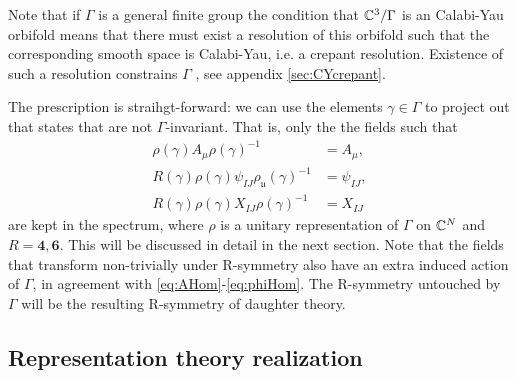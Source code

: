 \documentclass[a4paper,10pt]{article}
\begin{document}
        Note that if $\Gamma$ is a general finite group the condition that $\mathbb{C}^3/\Gamma$ is an Calabi-Yau orbifold means that there must exist a resolution of this orbifold such that the corresponding smooth space is Calabi-Yau, i.e. a crepant resolution. Existence of such a resolution constrains $\Gamma$ \marker, see appendix \ref{sec:CYcrepant}.

        The prescription is straihgt-forward: we can use the elements $\gamma\in\Gamma$ to project out that states that are not $\Gamma$-invariant. That is, only the the fields such that
        \begin{align}
            \rho(\gamma) A_\mu \rho(\gamma)^{-1} &= A_\mu,\label{eq:proj1}\\
            R(\gamma)\rho(\gamma) \psi_{IJ} \rho_{\mathfrak{u}}(\gamma)^{-1} &= \psi_{IJ}\label{eq:proj2},\\
            R(\gamma)\rho(\gamma) X_{IJ} \rho(\gamma)^{-1} &= X_{IJ}\label{eq:proj3}
        \end{align}
        are kept in the spectrum, where $\rho$ is a unitary representation of $\Gamma$ on $\mathbb{C}^N$ and $R=\boldsymbol{4},\boldsymbol{6}$. This will be discussed in detail in the next section.  Note that the fields that transform non-trivially under R-symmetry also have an extra induced action of $\Gamma$, in agreement with \eqref{eq:AHom}-\eqref{eq:phiHom}. The R-symmetry untouched by $\Gamma$ will be the resulting R-symmetry of daughter theory.

    \subsection{Representation theory realization}
\end{document}
